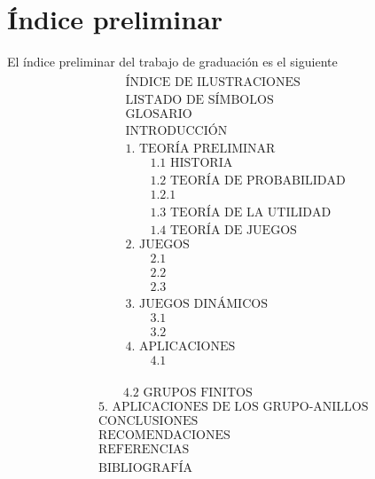\documentclass[12pt,letterpaper,titlepage]{article}
\begin{document}
\section{Índice preliminar}
El índice preliminar del trabajo de graduación es el siguiente
\begin{align*}
&\text{ÍNDICE DE ILUSTRACIONES}\\
&\text{LISTADO DE SÍMBOLOS}\\
&\text{GLOSARIO}\\
&\text{INTRODUCCIÓN}\\
&\text{1. TEORÍA PRELIMINAR}\\
&\qquad\text{1.1 HISTORIA}\\
&\qquad\text{1.2 TEORÍA DE PROBABILIDAD}\\
&\qquad\text{1.2.1}\\
&\qquad\text{1.3 TEORÍA DE LA UTILIDAD}\\
&\qquad\text{1.4 TEORÍA DE JUEGOS}\\
&\text{2. JUEGOS }\\
&\qquad\text{2.1 }\\
&\qquad\text{2.2 }\\
&\qquad\text{2.3 }\\
&\text{3. JUEGOS DINÁMICOS }\\
&\qquad\text{3.1 }\\
&\qquad\text{3.2 }\\
&\text{4. APLICACIONES }\\
&\qquad\text{4.1}\\
\end{align*}

\newpage
\begin{align*}
&\qquad\text{4.2 GRUPOS FINITOS}\\
&\text{5. APLICACIONES DE LOS GRUPO-ANILLOS }\\
&\text{CONCLUSIONES}\\
&\text{RECOMENDACIONES}\\ %
&\text{REFERENCIAS}\\ %
&\text{BIBLIOGRAFÍA} %
\end{align*}

\newpage
\end{document}
